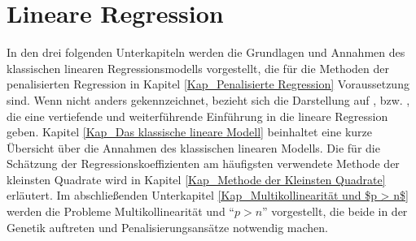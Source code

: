 \documentclass[12pt, a4paper]{report}\usepackage[]{graphicx}\usepackage[]{color}
\begin{document}
\section{Lineare Regression}\label{Kap_Lineare Regression}
In den drei folgenden Unterkapiteln werden die Grundlagen und Annahmen des klassischen linearen Regressionsmodells vorgestellt, die für die Methoden der penalisierten Regression in Kapitel \ref{Kap_Penalisierte Regression} Voraussetzung sind. Wenn nicht anders gekennzeichnet, bezieht sich die Darstellung auf ,  bzw. , die eine vertiefende und weiterführende Einführung in die lineare Regression geben. Kapitel \ref{Kap_Das klassische lineare Modell} beinhaltet eine kurze Übersicht über die Annahmen des klassischen linearen Modells. Die für die Schätzung der Regressionskoeffizienten am häufigsten verwendete Methode der kleinsten Quadrate wird in Kapitel \ref{Kap_Methode der Kleinsten Quadrate} erläutert. Im abschließenden Unterkapitel \ref{Kap_Multikollinearität und $p > n$} werden die Probleme Multikollinearität und "`$p > n$"' vorgestellt, die beide in der Genetik auftreten und Penalisierungsansätze notwendig machen.
\begin{comment}
$\mathbf{X}$ sind ZVs\\
$\mathbf{y}$ ist eine kontinuierliche ZVs
\end{comment}
\end{document}
